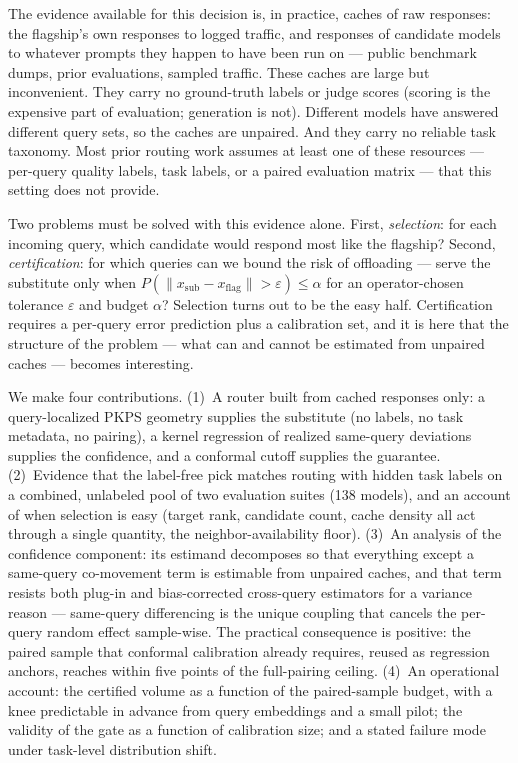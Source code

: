 \documentclass{article}
\newcommand{\PKPS}{PKPS\xspace}
\newcommand{\eps}{\varepsilon}
\begin{document}
The evidence available for this decision is, in practice, caches of raw
responses: the flagship's own responses to logged traffic, and responses
of candidate models to whatever prompts they happen to have been run on
--- public benchmark dumps, prior evaluations, sampled traffic. These
caches are large but inconvenient. They carry no ground-truth labels or
judge scores (scoring is the expensive part of evaluation; generation is
not). Different models have answered different query sets, so the caches
are unpaired. And they carry no reliable task taxonomy. Most prior routing
work assumes at least one of these resources --- per-query quality labels,
task labels, or a paired evaluation matrix --- that this setting does not
provide.

Two problems must be solved with this evidence alone. First,
\emph{selection}: for each incoming query, which candidate would respond
most like the flagship? Second, \emph{certification}: for which queries can
we bound the risk of offloading --- serve the substitute only when
$P(\lVert x_{\text{sub}} - x_{\text{flag}}\rVert > \eps) \le \alpha$ for an
operator-chosen tolerance $\eps$ and budget $\alpha$? Selection turns out
to be the easy half. Certification requires a per-query error prediction
plus a calibration set, and it is here that the structure of the problem
--- what can and cannot be estimated from unpaired caches --- becomes
interesting.

We make four contributions. (1)~A router built from cached responses only:
a query-localized \PKPS geometry supplies the substitute (no labels, no
task metadata, no pairing), a kernel regression of realized same-query
deviations supplies the confidence, and a conformal cutoff supplies the
guarantee. (2)~Evidence that the label-free pick matches routing with
hidden task labels on a combined, unlabeled pool of two evaluation suites
(138 models), and an account of when selection is easy (target rank,
candidate count, cache density all act through a single quantity, the
neighbor-availability floor). (3)~An analysis of the confidence component:
its estimand decomposes so that everything except a same-query co-movement
term is estimable from unpaired caches, and that term resists both
plug-in and bias-corrected cross-query estimators for a variance reason
--- same-query differencing is the unique coupling that cancels the
per-query random effect sample-wise. The practical consequence is
positive: the paired sample that conformal calibration already requires,
reused as regression anchors, reaches within five points of the
full-pairing ceiling. (4)~An operational account: the certified volume as
a function of the paired-sample budget, with a knee predictable in advance
from query embeddings and a small pilot; the validity of the gate as a
function of calibration size; and a stated failure mode under task-level
distribution shift.
\end{document}
